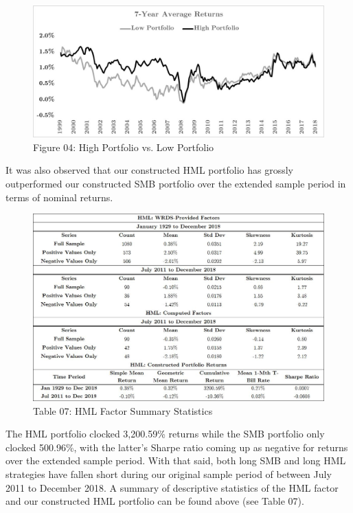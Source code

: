 \documentclass[12pt]{article}
\begin{document}
\begin{figure}[h]
	\centering
	\includegraphics[width=0.8\linewidth,trim=4 4 4 4,clip]{HML02}
	\caption*{Figure 04: High Portfolio vs. Low Portfolio}
	\label{fig:label}
\end{figure}

\noindent It was also observed that our constructed HML portfolio has grossly outperformed our constructed SMB portfolio over the extended sample period in terms of nominal returns. 

\begin{figure}[h]
	\centering
	\includegraphics[width=0.9\linewidth,trim=4 4 4 4,clip]{HML03}
	\caption*{Table 07: HML Factor Summary Statistics}
	\label{fig:label}
\end{figure}

\newpage

\noindent The HML portfolio clocked 3,200.59\% returns while the SMB portfolio only clocked 500.96\%, with the latter's Sharpe ratio coming up as negative for returns over the extended sample period. With that said, both long SMB and long HML strategies have fallen short during our original sample period of between July 2011 to December 2018. A summary of descriptive statistics of the HML factor and our constructed HML portfolio can be found above (see Table 07).\\
\end{document}
